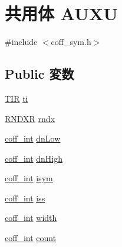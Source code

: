 \hypertarget{unionAUXU}{
\section{共用体 AUXU}
\label{unionAUXU}
}


{\ttfamily \#include $<$coff\_\-sym.h$>$}\subsection*{Public 変数}
\begin{DoxyCompactItemize}
\item 
\hyperlink{structTIR}{TIR} \hyperlink{unionAUXU_a548accea0e00f2b327dc98585a2add5b}{ti}
\item 
\hyperlink{structRNDXR}{RNDXR} \hyperlink{unionAUXU_a5922441bb6d02af2cb6d840862a40226}{rndx}
\item 
\hyperlink{ecoff__machdep_8h_a484fbe8ab04f62e9ac2341a8275f3c35}{coff\_\-int} \hyperlink{unionAUXU_af1d3fd41e6f4f96368e3fb0a461d4e3f}{dnLow}
\item 
\hyperlink{ecoff__machdep_8h_a484fbe8ab04f62e9ac2341a8275f3c35}{coff\_\-int} \hyperlink{unionAUXU_a5fe9b969210378a09487c8206a22d821}{dnHigh}
\item 
\hyperlink{ecoff__machdep_8h_a484fbe8ab04f62e9ac2341a8275f3c35}{coff\_\-int} \hyperlink{unionAUXU_a5b41af4e0a780cc1f8537a1f5f9b1eba}{isym}
\item 
\hyperlink{ecoff__machdep_8h_a484fbe8ab04f62e9ac2341a8275f3c35}{coff\_\-int} \hyperlink{unionAUXU_afbddcadc409c0ae593b2d7e4d5a368de}{iss}
\item 
\hyperlink{ecoff__machdep_8h_a484fbe8ab04f62e9ac2341a8275f3c35}{coff\_\-int} \hyperlink{unionAUXU_ad70eff56a66904a167767e8fcad8623c}{width}
\item 
\hyperlink{ecoff__machdep_8h_a484fbe8ab04f62e9ac2341a8275f3c35}{coff\_\-int} \hyperlink{unionAUXU_ad7e795ec47cfbfb276fbdb29c91a21f5}{count}
\end{DoxyCompactItemize}


